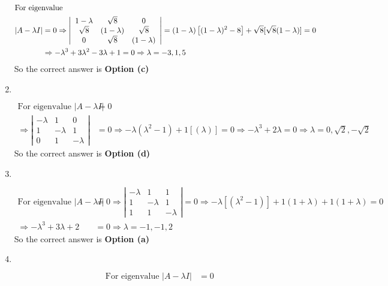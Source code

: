 \begin{enumerate}
\begin{answer}
\begin{align*}
	\intertext{For eigenvalue}
	|A-\lambda I|&=0 \Rightarrow\left|\begin{array}{ccc}1-\lambda & \sqrt{8} & 0 \\ \sqrt{8} & (1-\lambda) & \sqrt{8} \\ 0 & \sqrt{8} & (1-\lambda)\end{array}\right|=(1-\lambda)\left[(1-\lambda)^{2}-8\right]+\sqrt{8}[\sqrt{8}(1-\lambda)]=0\\
	&\Rightarrow-\lambda^{3}+3 \lambda^{2}-3 \lambda+1=0 \Rightarrow \lambda=-3,1,5
	\end{align*}
		So the correct answer is \textbf{Option (c)}
\end{answer}
\item $\left. \right. $	
\begin{answer}
	\begin{align*}
	\text{For eigenvalue }|A-\lambda I|&=0\\
	\Rightarrow\left|\begin{array}{ccc}-\lambda & 1 & 0 \\ 1 & -\lambda & 1 \\ 0 & 1 & -\lambda\end{array}\right|&=0 \Rightarrow-\lambda\left(\lambda^{2}-1\right)+1[(\lambda)]=0 \Rightarrow-\lambda^{3}+2 \lambda=0 \Rightarrow \lambda=0, \sqrt{2},-\sqrt{2}
	\end{align*}
		So the correct answer is \textbf{Option (d)}
\end{answer}
\item $\left. \right. $
\begin{answer}
	\begin{align*}
	\text{For eigenvalue }|A-\lambda I|&=0 \Rightarrow\left|\begin{array}{ccc}-\lambda & 1 & 1 \\ 1 & -\lambda & 1 \\ 1 & 1 & -\lambda\end{array}\right|=0 \Rightarrow-\lambda\left[\left(\lambda^{2}-1\right)\right]+1(1+\lambda)+1(1+\lambda)=0\\
	\Rightarrow-\lambda^{3}+3 \lambda+2&=0 \Rightarrow \lambda=-1,-1,2
	\end{align*}
	So the correct answer is \textbf{Option (a)}
\end{answer}
\item $\left. \right. $
\begin{answer}
	\begin{align*}
\text{	For eigenvalue } |A-\lambda I|&=0\\

\end{align*}
\end{answer}
\end{enumerate}
